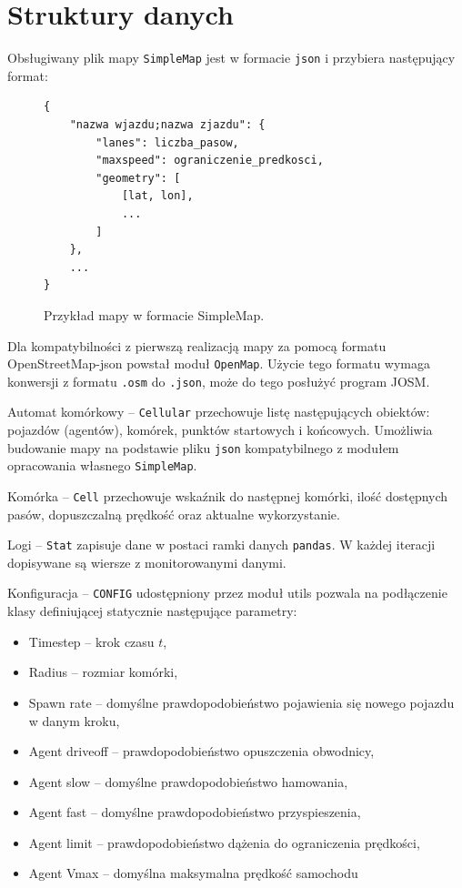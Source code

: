 \documentclass[a4paper,12pt]{article}
\begin{document}
    \section{Struktury danych}
    Obsługiwany plik mapy \texttt{SimpleMap} jest w formacie \texttt{json} i przybiera następujący format:
    \begin{center}
	    \begin{figure}[h]
	    	\begin{lstlisting}
{
	"nazwa wjazdu;nazwa zjazdu": {
		"lanes": liczba_pasow,
		"maxspeed": ograniczenie_predkosci,
		"geometry": [
			[lat, lon],
			...
		]
	},
	...
}
	    	\end{lstlisting}
	    	\caption{Przykład mapy w formacie SimpleMap.}
	    \end{figure}
    \end{center}
	Dla kompatybilności z pierwszą realizacją mapy za pomocą formatu OpenStreetMap-json powstał moduł \texttt{OpenMap}. Użycie tego formatu wymaga konwersji z formatu \texttt{.osm} do \texttt{.json}, może do tego posłużyć program JOSM.
    
    Automat komórkowy -- \texttt{Cellular} przechowuje listę następujących obiektów: pojazdów (agentów), komórek, punktów startowych i końcowych.
    Umożliwia budowanie mapy na podstawie pliku \texttt{json} kompatybilnego z modułem opracowania własnego \texttt{SimpleMap}.
    
    Komórka -- \texttt{Cell} przechowuje wskaźnik do następnej komórki, ilość dostępnych pasów, dopuszczalną prędkość oraz aktualne wykorzystanie.
    
    Logi -- \texttt{Stat} zapisuje dane w postaci ramki danych \texttt{pandas}. W każdej iteracji dopisywane są wiersze z monitorowanymi danymi.
    
    Konfiguracja -- \texttt{CONFIG} udostępniony przez moduł utils pozwala na podłączenie klasy definiującej statycznie następujące parametry:
    \begin{itemize}
    	\item Timestep -- krok czasu $t$,
    	\item Radius -- rozmiar komórki,
    	\item Spawn rate -- domyślne prawdopodobieństwo pojawienia się nowego pojazdu w danym kroku,
    	\item Agent driveoff -- prawdopodobieństwo opuszczenia obwodnicy,
    	\item Agent slow -- domyślne prawdopodobieństwo hamowania,
    	\item Agent fast -- domyślne prawdopodobieństwo przyspieszenia,
    	\item Agent limit -- prawdopodobieństwo dążenia do ograniczenia prędkości,
    	\item Agent Vmax -- domyślna maksymalna prędkość samochodu
    \end{itemize}
\end{document}
